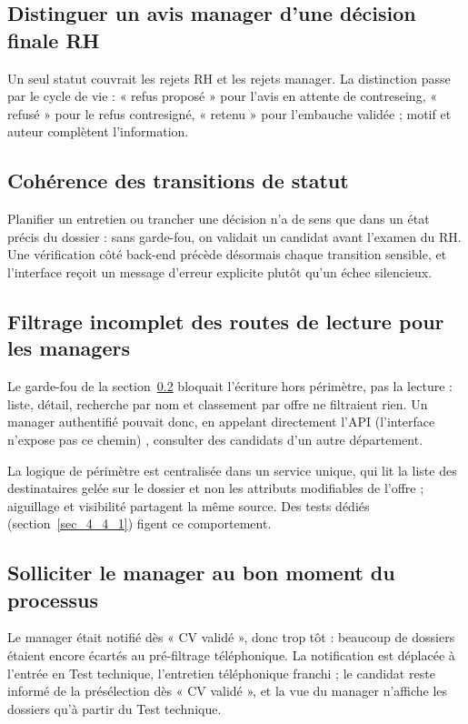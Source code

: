 \documentclass[]{./tpl/isipfe}
\begin{document}
\subsection{Distinguer un avis manager d’une décision finale RH}
\label{sec_4_5_2}
Un seul statut couvrait les rejets RH et les rejets manager. La distinction passe par le cycle de vie : « refus proposé » pour l’avis en attente de contreseing, « refusé » pour le refus contresigné, « retenu » pour l’embauche validée ; motif et auteur complètent l’information.

\subsection{Cohérence des transitions de statut}
\label{sec_4_5_3}
Planifier un entretien ou trancher une décision n’a de sens que dans un état précis du dossier : sans garde-fou, on validait un candidat avant l’examen du RH. Une vérification côté back-end précède désormais chaque transition sensible, et l’interface reçoit un message d’erreur explicite plutôt qu’un échec silencieux.

\subsection{Filtrage incomplet des routes de lecture pour les managers}
\label{sec_4_5_4}
Le garde-fou de la section~\ref{sec_4_5_3} bloquait l’écriture hors périmètre, pas la lecture : liste, détail, recherche par nom et classement par offre ne filtraient rien. Un manager authentifié pouvait donc, en appelant directement l’API (l’interface n’expose pas ce chemin) , consulter des candidats d’un autre département.

La logique de périmètre est centralisée dans un service unique, qui lit la liste des destinataires gelée sur le dossier et non les attributs modifiables de l’offre ; aiguillage et visibilité partagent la même source. Des tests dédiés (section~\ref{sec_4_4_1}) figent ce comportement.

\subsection{Solliciter le manager au bon moment du processus}
\label{sec_4_5_5}
Le manager était notifié dès « CV validé », donc trop tôt : beaucoup de dossiers étaient encore écartés au pré-filtrage téléphonique. La notification est déplacée à l’entrée en Test technique, l’entretien téléphonique franchi ; le candidat reste informé de la présélection dès « CV validé », et la vue du manager n’affiche les dossiers qu’à partir du Test technique.
\end{document}
